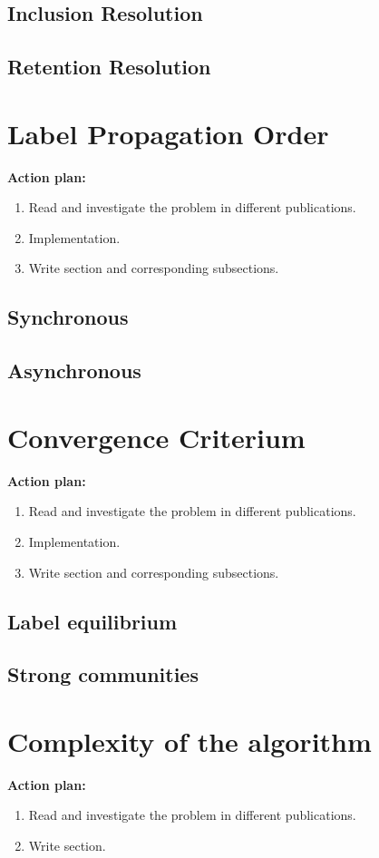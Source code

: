 \documentclass[a4paper, 12pt]{book}
\begin{document}
\subsection{Inclusion Resolution}
\subsection{Retention Resolution}
\section{Label Propagation Order}
\textbf{Action plan:}
   \begin{enumerate}
     \item Read and investigate the problem in different publications.
     \item Implementation.
     \item Write section and corresponding subsections.
   \end{enumerate}
\subsection{Synchronous}
\subsection{Asynchronous}
\section{Convergence Criterium}
\textbf{Action plan:}
   \begin{enumerate}
     \item Read and investigate the problem in different publications.
     \item Implementation.
     \item Write section and corresponding subsections.
   \end{enumerate}
\subsection{Label equilibrium}
\subsection{Strong communities}
\section{Complexity of the algorithm}
\textbf{Action plan:}
   \begin{enumerate}
     \item Read and investigate the problem in different publications.
     \item Write section.
   \end{enumerate}
\end{document}
